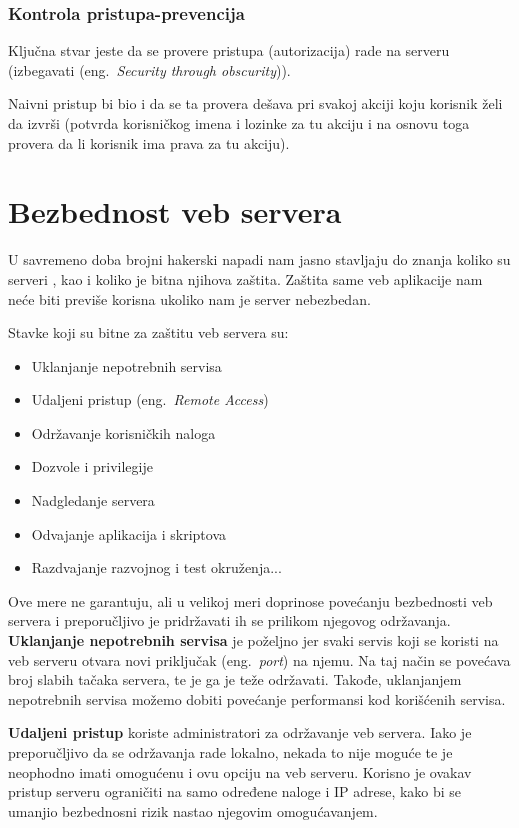 \documentclass[a4paper]{article}
\begin{document}
\subsubsection{Kontrola pristupa-prevencija}

Ključna stvar jeste da se provere pristupa (autorizacija) rade na serveru (izbegavati (eng.~{\em Security through obscurity})). 

Naivni pristup bi bio i da se ta provera dešava pri svakoj akciji koju korisnik želi da izvrši (potvrda korisničkog imena i lozinke za tu akciju i na osnovu toga provera da li korisnik ima prava za tu akciju).

\section{Bezbednost veb servera}

U savremeno doba brojni hakerski napadi nam jasno stavljaju do znanja koliko su serveri , kao i koliko je bitna njihova zaštita. Zaštita same veb aplikacije nam neće biti previše korisna ukoliko nam je server nebezbedan.

Stavke koji su bitne za zaštitu veb servera su:
\begin{itemize}
	\item Uklanjanje nepotrebnih servisa
	\item Udaljeni pristup (eng.~{\em Remote Access})
	\item Održavanje korisničkih naloga
	\item Dozvole i privilegije
	\item Nadgledanje servera
	\item Odvajanje aplikacija i skriptova
	\item Razdvajanje razvojnog i test okruženja...
\end{itemize}

Ove mere ne garantuju, ali u velikoj meri doprinose povećanju bezbednosti veb servera i preporučljivo je pridržavati ih se prilikom njegovog održavanja.\\

\textbf{Uklanjanje nepotrebnih servisa} je poželjno jer svaki servis koji se koristi na veb serveru otvara novi priključak (eng.~{\em port}) na njemu. Na taj način se povećava broj slabih tačaka servera, te je ga je teže održavati. Takođe, uklanjanjem nepotrebnih servisa možemo dobiti povećanje performansi kod korišćenih servisa.

\textbf{Udaljeni pristup} koriste administratori za održavanje veb servera. Iako je preporučljivo da se održavanja rade lokalno, nekada to nije moguće te je neophodno imati omogućenu i ovu opciju na veb serveru. Korisno je ovakav pristup serveru ograničiti na samo određene naloge i IP adrese, kako bi se umanjio bezbednosni rizik nastao njegovim omogućavanjem.
\end{document}

